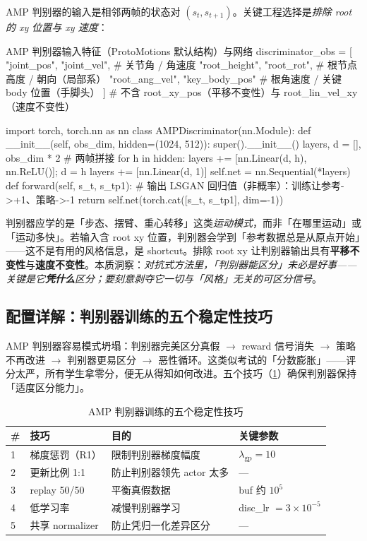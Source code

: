 AMP 判别器的输入是相邻两帧的状态对 $(s_t,s_{t+1})$。关键工程选择是\emph{排除 root 的 xy 位置与 xy 速度}：

\begin{codebox}[Python]{AMP 判别器输入特征（ProtoMotions 默认结构）与网络}
discriminator_obs = [
    "joint_pos", "joint_vel",      # 关节角 / 角速度
    "root_height", "root_rot",     # 根节点高度 / 朝向（局部系）
    "root_ang_vel", "key_body_pos" # 根角速度 / 关键 body 位置（手脚头）
]
# 不含 root_xy_pos（平移不变性）与 root_lin_vel_xy（速度不变性）

import torch, torch.nn as nn
class AMPDiscriminator(nn.Module):
    def __init__(self, obs_dim, hidden=(1024, 512)):
        super().__init__()
        layers, d = [], obs_dim * 2          # 两帧拼接
        for h in hidden:
            layers += [nn.Linear(d, h), nn.ReLU()]; d = h
        layers += [nn.Linear(d, 1)]
        self.net = nn.Sequential(*layers)
    def forward(self, s_t, s_tp1):
        # 输出 LSGAN 回归值（非概率）：训练让参考->+1、策略->-1
        return self.net(torch.cat([s_t, s_tp1], dim=-1))
\end{codebox}

\begin{insight}[排除 root xy = 让判别器学「运动模式」而非「在哪运动」]\label{ins:rlmc-imit-rootxy}
判别器应学的是「步态、摆臂、重心转移」这类\emph{运动模式}，而非「在哪里运动」或「运动多快」。若输入含 root xy 位置，判别器会学到「参考数据总是从原点开始」——这不是有用的风格信息，是 shortcut。排除 root xy 让判别器输出具有\textbf{平移不变性}与\textbf{速度不变性}。本质洞察：\emph{对抗式方法里，「判别器能区分」未必是好事——关键是它\textbf{凭什么}区分；要刻意剥夺它一切与「风格」无关的可区分信号}。
\end{insight}

\subsection{配置详解：判别器训练的五个稳定性技巧}
\label{sec:rlmc-imit-amp-tricks}

AMP 判别器容易模式坍塌：判别器完美区分真假 $\to$ reward 信号消失 $\to$ 策略不再改进 $\to$ 判别器更易区分 $\to$ 恶性循环。这类似考试的「分数膨胀」——评分太严，所有学生拿零分，便无从得知如何改进。五个技巧（\cref{tab:rlmc-imit-amptricks}）确保判别器保持「适度区分能力」。

\begin{table}[ht]
\centering
\small
\caption{AMP 判别器训练的五个稳定性技巧}
\label{tab:rlmc-imit-amptricks}
\begin{tabular}{@{}llll@{}}
\toprule
\# & 技巧 & 目的 & 关键参数 \\
\midrule
1 & 梯度惩罚（R1） & 限制判别器梯度幅度 & $\lambda_{\text{gp}}=10$ \\
2 & 更新比例 1:1 & 防止判别器领先 actor 太多 & --- \\
3 & replay 50/50 & 平衡真假数据 & buf 约 $10^5$ \\
4 & 低学习率 & 减慢判别器学习 & disc\_lr $=3\times10^{-5}$ \\
5 & 共享 normalizer & 防止凭归一化差异区分 & --- \\
\bottomrule
\end{tabular}
\end{table}

